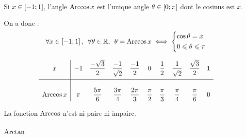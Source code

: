 \begin{prop}[Caractérisation]
Si \(x\in\left[-1;1\right]\), l'angle \(\operatorname{Arccos} x\) est l'unique angle \(\theta\in\left[0;\pi\right]\) dont le cosinus est \(x\).

On a donc : \[\quantifs{\forall x\in\intervii{-1}{1};\forall\theta\in\R}\theta=\Arccos x\ssi\begin{dcases}\cos\theta=x \\ 0\leq\theta\leq\pi\end{dcases}\]
\end{prop}

\begin{ex}
\[\begin{array}{c|ccccccccc}
x & -1 & \dfrac{-\sqrt{3}}{2} & \dfrac{-1}{\sqrt{2}} & \dfrac{-1}{2} & 0 & \dfrac{1}{2} & \dfrac{1}{\sqrt{2}} & \dfrac{\sqrt{3}}{2} & 1 \\[1em]
\hline \\
\operatorname{Arccos} x & \pi & \dfrac{5\pi}{6} & \dfrac{3\pi}{4} & \dfrac{2\pi}{3} & \dfrac{\pi}{2} & \dfrac{\pi}{3} & \dfrac{\pi}{4} & \dfrac{\pi}{6} & 0
\end{array}\]
\end{ex}

\begin{prop}
La fonction \(\operatorname{Arccos}\) n'est ni paire ni impaire.
\end{prop}

\subsubsection{\(\operatorname{Arctan}\)}

